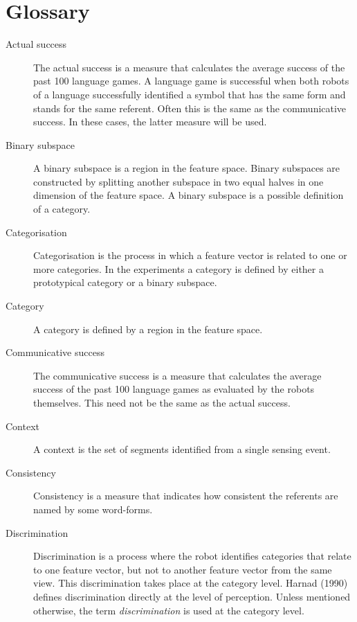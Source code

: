 \chapter{Glossary}

\begin{description}

\item[Actual success] The actual success is a measure that calculates the average success of the past 100 language games. A language game is successful when both robots of a language successfully identified a symbol that has the same form and stands for the same referent. Often this is the same as the communicative success. In these cases, the latter measure will be used.

\item[Binary subspace] A binary subspace is a region in the feature space. Binary subspaces are constructed by splitting another subspace in two equal halves in one dimension of the feature space. A binary subspace is a possible definition of a category.

\item[Categorisation] Categorisation is the process in which a feature vector is related to one or more categories. In the experiments a category is defined by either a prototypical category or a binary subspace.

\item[Category] A category is defined by a region in the feature space.

\item[Communicative success] The communicative success is a measure that calculates the average success of the past 100 language games as evaluated by the robots themselves. This need not be the same as the actual success.

\item[Context] A context is the set of segments identified from a single sensing event.

\item[Consistency] Consistency is a measure that indicates how consistent the referents are named by some word-forms.

\item[Discrimination] Discrimination is a process where the robot identifies categories that relate to one feature vector, but not to another feature vector from the same view. This discrimination takes place at the category level. Harnad (1990) defines discrimination directly at the level of perception. Unless mentioned otherwise, the term {\it discrimination} is used at the category level.


\end{description}

